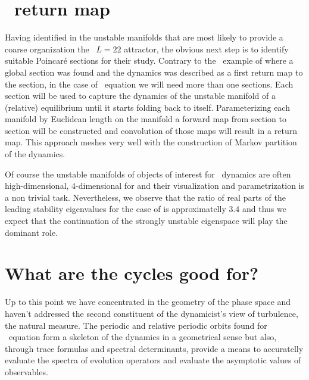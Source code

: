 

\section{\KS\ return map}

Having identified in  the unstable manifolds that are most likely to provide
a coarse organization the \KS\ $L=22$ attractor, the obvious next step is to identify
suitable Poincar\'e sections for their study. Contrary to the \CLe\ example of 
where a global section was found and the dynamics was described as a first return map to the section,
in the case of \KS\ equation we will need more than one sections. Each section will be used to
capture the dynamics of the unstable manifold of a (relative) equilibrium until it starts folding back 
to itself. Parameterizing each manifold by Euclidean length on the manifold a forward map from section to section will be constructed and convolution of those maps will result in a return map. This approach
meshes very well with the construction of Markov partition of the dynamics.

Of course the unstable manifolds of objects of interest for \KS\ dynamics are often high-dimensional,
\eg $4$-dimensional for  and their visualization and parametrization is a non trivial task.
Nevertheless, we observe that the ratio of real parts of the leading stability eigenvalues for the case of  is approximatelly $3.4$ and thus we expect that the continuation of the strongly unstable eigenspace will play the dominant role.

\section{What are the cycles good for?}

Up to this point we have concentrated in the geometry of the phase space and haven't addressed
the second constituent of the dynamicist's view of turbulence, the natural measure. The periodic
and relative periodic orbits found for \KS\ equation form a skeleton of the dynamics in a geometrical sense but also, through trace formulas and spectral determinants, provide
a means to accuratelly evaluate the spectra of evolution operators and evaluate the asymptotic
values of observables. 

